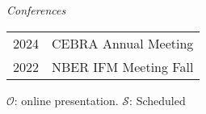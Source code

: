\documentclass[10pt]{article}
\begin{document}
\noindent \emph{Conferences}\\[0.1in]
\begin{tabular}{@{}p{1.8cm}p{13cm}}
    2024 & CEBRA Annual Meeting\\
2022& NBER IFM Meeting Fall
\end{tabular}


{\footnotesize $\mathcal{O}$: online presentation. $\mathcal{S}$: Scheduled}









%
%
%

\end{document}
